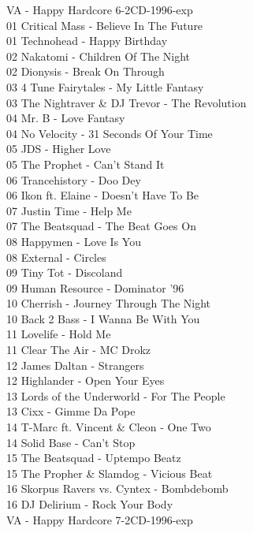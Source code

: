 \begin{multicols}{2}
 \large VA - Happy Hardcore 6-2CD-1996-exp \normalsize\\
 01 Critical Mass - Believe In The Future\\ 01 Technohead - Happy Birthday\\ 02 Nakatomi - Children Of The Night\\ 02 Dionysis - Break On Through\\ 03 4 Tune Fairytales - My Little Fantasy\\ 03 The Nightraver \& DJ Trevor - The Revolution\\ 04 Mr. B - Love Fantasy\\ 04 No Velocity - 31 Seconds Of Your Time\\ 05 JDS - Higher Love\\ 05 The Prophet - Can't Stand It\\ 06 Trancehistory - Doo Dey\\ 06 Ikon ft. Elaine - Doesn't Have To Be\\ 07 Justin Time - Help Me\\ 07 The Beatsquad - The Beat Goes On\\ 08 Happymen - Love Is You\\ 08 External - Circles\\ 09 Tiny Tot - Discoland\\ 09 Human Resource - Dominator '96\\ 10 Cherrish - Journey Through The Night\\ 10 Back 2 Bass - I Wanna Be With You\\ 11 Lovelife - Hold Me\\ 11 Clear The Air - MC Drokz\\ 12 James Daltan - Strangers\\ 12 Highlander - Open Your Eyes\\ 13 Lords of the Underworld - For The People\\ 13 Cixx - Gimme Da Pope\\ 14 T-Marc ft. Vincent \& Cleon - One Two\\ 14 Solid Base - Can't Stop\\ 15 The Beatsquad - Uptempo Beatz\\ 15 The Propher \& Slamdog - Vicious Beat\\ 16 Skorpus Ravers vs. Cyntex - Bombdebomb\\ 16 DJ Delirium - Rock Your Body\\
 \large VA - Happy Hardcore 7-2CD-1996-exp \normalsize\\

\end{multicols}
